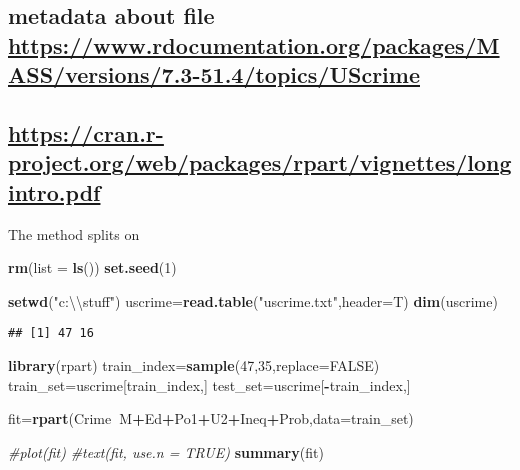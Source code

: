 \documentclass[]{article}
\newenvironment{Shaded}{\begin{snugshade}}{\end{snugshade}}
\newcommand{\CharTok}[1]{\textcolor[rgb]{0.31,0.60,0.02}{#1}}
\newcommand{\CommentTok}[1]{\textcolor[rgb]{0.56,0.35,0.01}{\textit{#1}}}
\newcommand{\DataTypeTok}[1]{\textcolor[rgb]{0.13,0.29,0.53}{#1}}
\newcommand{\DecValTok}[1]{\textcolor[rgb]{0.00,0.00,0.81}{#1}}
\newcommand{\KeywordTok}[1]{\textcolor[rgb]{0.13,0.29,0.53}{\textbf{#1}}}
\newcommand{\NormalTok}[1]{#1}
\newcommand{\OperatorTok}[1]{\textcolor[rgb]{0.81,0.36,0.00}{\textbf{#1}}}
\newcommand{\OtherTok}[1]{\textcolor[rgb]{0.56,0.35,0.01}{#1}}
\newcommand{\StringTok}[1]{\textcolor[rgb]{0.31,0.60,0.02}{#1}}
\begin{document}
\hypertarget{metadata-about-file-httpswww.rdocumentation.orgpackagesmassversions7.3-51.4topicsuscrime}{%
\subsection{\texorpdfstring{metadata about file
\url{https://www.rdocumentation.org/packages/MASS/versions/7.3-51.4/topics/UScrime}}{metadata about file https://www.rdocumentation.org/packages/MASS/versions/7.3-51.4/topics/UScrime}}\label{metadata-about-file-httpswww.rdocumentation.orgpackagesmassversions7.3-51.4topicsuscrime}}

\hypertarget{httpscran.r-project.orgwebpackagesrpartvignetteslongintro.pdf}{%
\subsection{\texorpdfstring{\url{https://cran.r-project.org/web/packages/rpart/vignettes/longintro.pdf}}{https://cran.r-project.org/web/packages/rpart/vignettes/longintro.pdf}}\label{httpscran.r-project.orgwebpackagesrpartvignetteslongintro.pdf}}

The method splits on

\begin{Shaded}
\begin{Highlighting}[]
\KeywordTok{rm}\NormalTok{(}\DataTypeTok{list =} \KeywordTok{ls}\NormalTok{())}
\KeywordTok{set.seed}\NormalTok{(}\DecValTok{1}\NormalTok{)}

\KeywordTok{setwd}\NormalTok{(}\StringTok{"c:}\CharTok{\textbackslash{}\textbackslash{}}\StringTok{stuff"}\NormalTok{)}
\NormalTok{uscrime=}\KeywordTok{read.table}\NormalTok{(}\StringTok{"uscrime.txt"}\NormalTok{,}\DataTypeTok{header=}\NormalTok{T)}
\KeywordTok{dim}\NormalTok{(uscrime)}
\end{Highlighting}
\end{Shaded}

\begin{verbatim}
## [1] 47 16
\end{verbatim}

\begin{Shaded}
\begin{Highlighting}[]
\KeywordTok{library}\NormalTok{(rpart)}
\NormalTok{train_index=}\KeywordTok{sample}\NormalTok{(}\DecValTok{47}\NormalTok{,}\DecValTok{35}\NormalTok{,}\DataTypeTok{replace=}\OtherTok{FALSE}\NormalTok{)}
\NormalTok{train_set=uscrime[train_index,]}
\NormalTok{test_set=uscrime[}\OperatorTok{-}\NormalTok{train_index,]}

\NormalTok{fit=}\KeywordTok{rpart}\NormalTok{(Crime}\OperatorTok{~}\NormalTok{M}\OperatorTok{+}\NormalTok{Ed}\OperatorTok{+}\NormalTok{Po1}\OperatorTok{+}\NormalTok{U2}\OperatorTok{+}\NormalTok{Ineq}\OperatorTok{+}\NormalTok{Prob,}\DataTypeTok{data=}\NormalTok{train_set)}

\CommentTok{#plot(fit)}
\CommentTok{#text(fit, use.n = TRUE)}
\KeywordTok{summary}\NormalTok{(fit)}
\end{Highlighting}
\end{Shaded}
\end{document}
